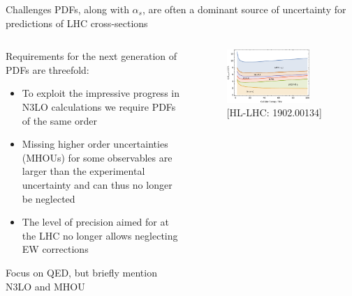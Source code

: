 \documentclass[aspectratio=169, 8pt,t]{beamer}
\begin{document}
\begin{frame}{Challenges}
  PDFs, along with $\alpha_s$, are often a dominant source of uncertainty for predictions of LHC cross-sections 
  \begin{columns}
    \begin{column}{0.49\textwidth}
      \vspace*{1em}

      Requirements for the next generation of PDFs are threefold:
      \begin{itemize}
        \item To exploit the impressive progress in N3LO calculations we require PDFs of the same order
        \item Missing higher order uncertainties (MHOUs) for some observables are larger than the experimental uncertainty and can thus no longer be neglected
        \item The level of precision aimed for at the LHC no longer allows neglecting EW corrections
      \end{itemize}

      \vspace*{1em}
      Focus on QED, but briefly mention N3LO and MHOU
    \end{column}

    \begin{column}{0.49\textwidth}
      \begin{figure}
        \includegraphics[width=0.8\textwidth]{figures/sources_of_unceratinty.pdf}
        \caption*{\color{gray}\small [HL-LHC: 1902.00134]}
      \end{figure}
    \end{column}
  \end{columns}
\end{frame}


\end{document}
